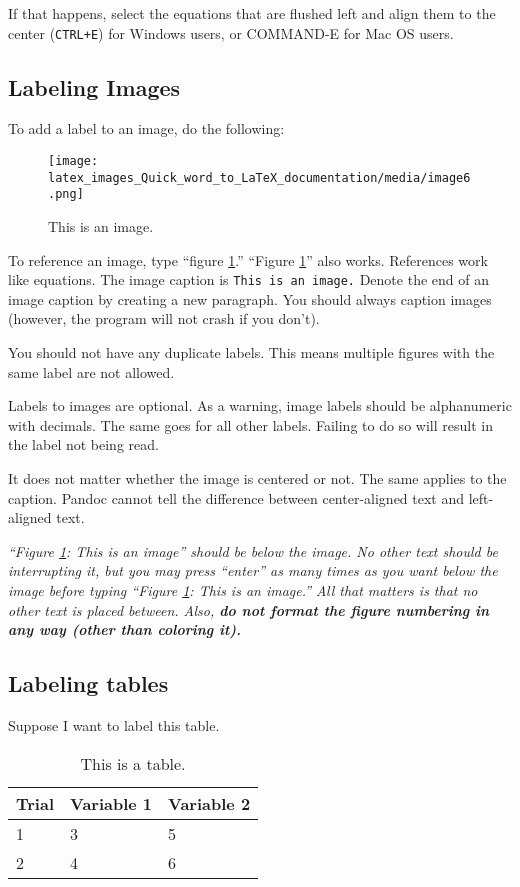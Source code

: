 \documentclass[12pt]{article}
\theoremstyle{plain}
\theoremstyle{remark}
\theoremstyle{definition}
\begin{document}
If that happens, select the equations that are flushed left and align
them to the center (\texttt{CTRL+E}) for Windows users, or COMMAND-E for
Mac OS users.


\subsection{Labeling Images}

To add a label to an image, do the following:


\begin{figure}[H]
\centering
\texttt{[image: latex\_images\_Quick\_word\_to\_LaTeX\_documentation/media/image6.png]}
\caption{This is an image.}
\label{fig:p1}
\end{figure}



To reference an image, type ``figure \ref{fig:p1}.'' ``Figure \ref{fig:p1}'' also works.
References work like equations. The image caption is
\texttt{This\ is\ an\ image.} Denote the end of an image caption by
creating a new paragraph. You should always caption images (however, the
program will not crash if you don't).

You should not have any duplicate labels. This means multiple figures
with the same label are not allowed.

Labels to images are optional. As a warning, image labels should be
alphanumeric with decimals. The same goes for all other labels. Failing
to do so will result in the label not being read.

It does not matter whether the image is centered or not. The same
applies to the caption. Pandoc cannot tell the difference between
center-aligned text and left-aligned text.

\emph{``Figure \ref{fig:p1}: This is an image'' should be below the image. No other
text should be interrupting it, but you may press ``enter'' as many
times as you want below the image before typing ``Figure \ref{fig:p1}: This is an
image.'' All that matters is that no other text is placed between. Also,
\textbf{do not format the figure numbering in any way (other than
coloring it).}}


\subsection{Labeling tables}

Suppose I want to label this table.

\begin{table}[H]
\centering

\label{table:p1}

\begin{tabular}{|m{13em}|m{13em}|m{13em}|}

\hline
Trial& Variable 1& Variable 2\\ \hline
1 & 3 & 5 \\ \hline
2 & 4 & 6
\\\hline
\end{tabular}
\caption{This is a table.}

\end{table}
\end{document}
